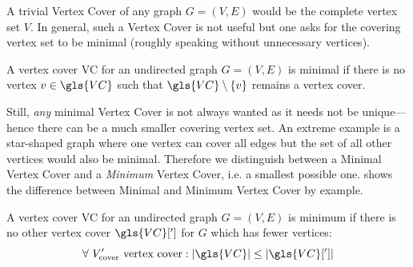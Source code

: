 A trivial Vertex Cover of any graph \(G=(V,E)\) would be the complete
vertex set \(V\). In general, such a Vertex Cover is not useful but
one asks for the covering vertex set to be minimal (roughly speaking
without unnecessary vertices).

\begin{definition}
  A vertex cover \gls{VC} for an undirected graph
  \(G=(V,E)\) is minimal if there is no vertex
  \(v \in \gls{VC}\) such that
  \(\gls{VC} \setminus \{v\}\) remains a vertex cover.
\end{definition}

Still, \emph{any} minimal Vertex Cover is not always wanted as it
needs not be unique---hence there can be a much smaller covering
vertex set. An extreme example is a star-shaped graph where one vertex
can cover all edges but the set of all other vertices would also be
minimal. Therefore we distinguish between a Minimal Vertex Cover and
a \emph{Minimum} Vertex Cover, i.e. a smallest possible one. 
 shows the difference between Minimal
and Minimum Vertex Cover by example.

\begin{definition}
  A vertex cover \gls{VC} for an undirected graph
  \(G=(V,E)\) is minimum if there is no other vertex cover
  \(\gls{VC}[']\) for \(G\) which has fewer vertices:
  \[
    \forall~V_{\text{cover}}'\text{ vertex cover} :
    |\gls{VC}| \leq |\gls{VC}[']|
  \]
\end{definition}

